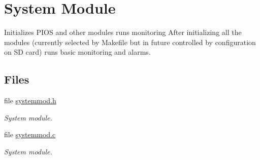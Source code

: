 \hypertarget{group___system_module}{\section{System Module}
\label{group___system_module}
}


Initializes P\-I\-O\-S and other modules runs monitoring After initializing all the modules (currently selected by Makefile but in future controlled by configuration on S\-D card) runs basic monitoring and alarms.  


\subsection*{Files}
\begin{DoxyCompactItemize}
\item 
file \hyperlink{systemmod_8h}{systemmod.\-h}
\begin{DoxyCompactList}\small\item\em System module. \end{DoxyCompactList}\item 
file \hyperlink{systemmod_8c}{systemmod.\-c}
\begin{DoxyCompactList}\small\item\em System module. \end{DoxyCompactList}\end{DoxyCompactItemize}
